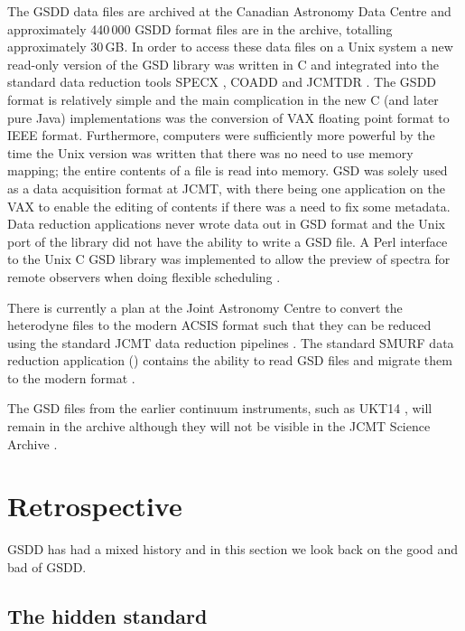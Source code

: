 \documentclass[final,authoryear,5p,times,twocolumn]{elsarticle}
\begin{document}
The GSDD data files are archived at the Canadian Astronomy Data
Centre and approximately 440\,000 GSDD format files are in the
archive, totalling approximately 30\,GB. In order to access these data
files on a Unix system a new read-only version of the GSD library was
written in C \citep{SUN229} and integrated into the standard data
reduction tools SPECX \citep[][]{SPECX,1990JCMTP...9...25P}, COADD
\citep[][]{COADD}  and JCMTDR
\citep[][]{SUN132}.  The GSDD format is relatively
simple and the main complication in the new C (and later pure Java)
implementations was the conversion of VAX floating point format to
IEEE format. Furthermore, computers were sufficiently more powerful
by the time the Unix version was written that there was no need to use
memory mapping; the entire contents of a file is read into memory.
GSD was solely used as a data acquisition format at JCMT, with there
being one application on the VAX to enable the editing of contents if
there was a need to fix some metadata. Data reduction applications
never wrote data out in GSD format and the Unix port of the library
did not have the ability to write a GSD file.
A Perl interface to the Unix C GSD library \citep{1999ASPC..172..494J}
was implemented to allow the preview of spectra for remote observers
when doing flexible scheduling \citep{1997ASPC..125..401J}.

There is currently a plan at the Joint Astronomy Centre to convert the
heterodyne files to the modern ACSIS format \citep{OCS_ICD_022} such that they can be
reduced using the standard JCMT data reduction pipelines
\citep{2015ACSISDR,2008ASPC..394..565J}. The standard SMURF data reduction application
(\nocite{2013ascl.soft10007J}) contains the ability to
read GSD files and migrate them to the modern format \citep{SUN259}.

The GSD files from the earlier continuum instruments, such as UKT14
\citep{1990MNRAS.243..126D}, will remain in the archive although they
will not be visible in the JCMT Science Archive \citep{2015Economou}.


\section{Retrospective}

GSDD has had a mixed history and in this section we look back on the
good and bad of GSDD.

\subsection{The hidden standard}
\end{document}
